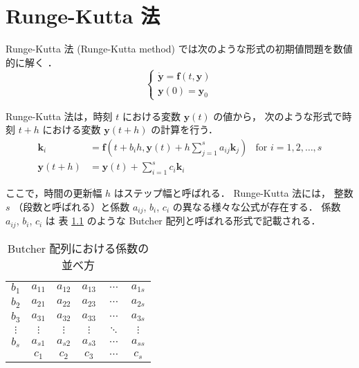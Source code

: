 %

\chapter{Runge-Kutta 法}

Runge-Kutta 法 (Runge-Kutta method) では次のような形式の初期値問題を数値的に解く
\cite{Mitsui1993}．
\begin{equation}
    \begin{cases}
        \dot{\bm{y}} = \bm{f}(t, \bm{y}) \\
        \bm{y}(0) = \bm{y}_0
    \end{cases}
\end{equation}

Runge-Kutta 法は，時刻 $t$ における変数 $\bm{y}(t)$ の値から，
次のような形式で時刻 $t + h$ における変数 $\bm{y}(t + h)$ の計算を行う．
\begin{align}
    \bm{k}_i      & = \bm{f}\left(t + b_i h, \bm{y}(t) + h \sum_{j = 1}^s a_{ij} \bm{k}_j \right)
                  & \text{for $i = 1, 2, \ldots, s$}
    \label{eq:ode_runge-kutta_k-law}                                                              \\
    \bm{y}(t + h) & = \bm{y}(t) + \sum_{i=1}^s c_i \bm{k}_i
    \label{eq:ode_runge-kutta_y-law}
\end{align}

ここで，時間の更新幅 $h$ はステップ幅と呼ばれる．
Runge-Kutta 法には，
整数 $s$ （段数と呼ばれる）と係数 $a_{ij}$, $b_i$, $c_i$ の異なる様々な公式が存在する．
係数 $a_{ij}$, $b_i$, $c_i$ は
表 \ref{table:ode_runge-kutta_butcher-array-general} のような
Butcher 配列と呼ばれる形式で記載される．

\begin{table}[bp]
    \caption{Butcher 配列における係数の並べ方}
    \label{table:ode_runge-kutta_butcher-array-general}
    \centering
    \begin{tabular}{c|ccccc}
        $b_1$    & $a_{11}$ & $a_{12}$ & $a_{13}$ & $\cdots$ & $a_{1s}$ \\
        $b_2$    & $a_{21}$ & $a_{22}$ & $a_{23}$ & $\cdots$ & $a_{2s}$ \\
        $b_3$    & $a_{31}$ & $a_{32}$ & $a_{33}$ & $\cdots$ & $a_{3s}$ \\
        $\vdots$ & $\vdots$ & $\vdots$ & $\vdots$ & $\ddots$ & $\vdots$ \\
        $b_s$    & $a_{s1}$ & $a_{s2}$ & $a_{s3}$ & $\cdots$ & $a_{ss}$ \\
        \hline
                 & $c_1$    & $c_2$    & $c_3$    & $\cdots$ & $c_s$
    \end{tabular}
\end{table}

